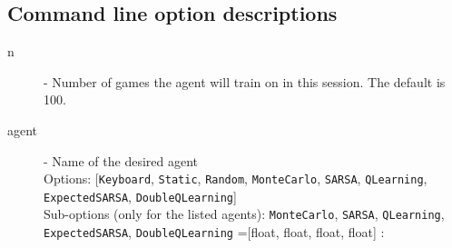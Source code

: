 \subsection{Command line option descriptions}
\begin{description}
\item[n] - Number of games the agent will train on in this session. The default is 100. \label{opt:n}
\item[agent] - Name of the desired agent \label{opt:agent}\\
Options: [\texttt{Keyboard}, \texttt{Static}, \texttt{Random}, \texttt{MonteCarlo}, \texttt{SARSA}, \texttt{QLearning}, \\ \texttt{ExpectedSARSA}, \texttt{DoubleQLearning}]\\
Sub-options (only for the listed agents):
\texttt{MonteCarlo}, \texttt{SARSA}, \texttt{QLearning}, \texttt{ExpectedSARSA}, \texttt{DoubleQLearning}
=[float, float, float, float] :


\end{description}
